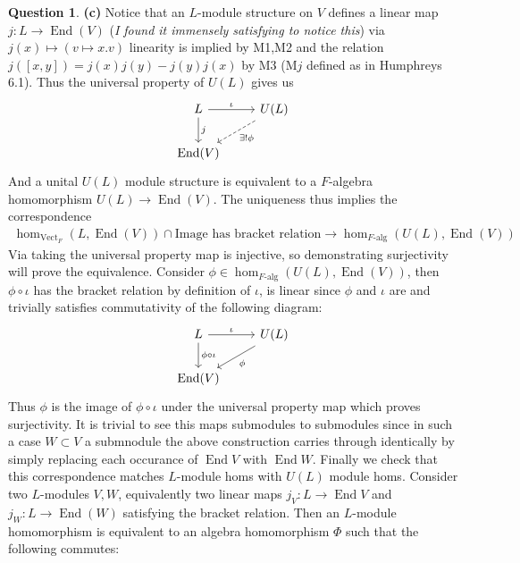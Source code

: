 \documentclass[10.5pt]{article}
\theoremstyle{definition}
\newtheorem{pb}{Question}
\numberwithin{example}{subsection}
\numberwithin{proposition}{subsection}
\begin{document}
\begin{pb}
        \textbf{(c)} Notice that an \(L\)-module structure on \(V\) defines a linear map \(j:L \to \operatorname{End}(V)\) (\emph{I found it immensely satisfying to notice this}) via \(j(x) \mapsto (v \mapsto x.v)\) linearity is implied by M1,M2 and the relation \(j([x,y]) = j(x)j(y) - j(y)j(x)\) by M3 (M\(j\) defined as in Humphreys 6.1). Thus the universal property of \(U(L)\) gives us
        \begin{equation}\begin{tikzcd}
            L \arrow[d,"j"] \arrow[r,"\iota"] &U(L) \arrow[dl,dashed,"\exists! \phi"] \\
            \operatorname{End}(V)
        \end{tikzcd}\end{equation}
        And a unital \(U(L)\) module structure is equivalent to a \(F\)-algebra homomorphism \(U(L) \to \operatorname{End}(V)\). The uniqueness thus implies the correspondence 
        \begin{align}
            \hom_{\operatorname{Vect}_F}(L,\operatorname{End}(V)) \cap \text{Image has bracket relation} \to \hom_{F\text{-alg}}(U(L),\operatorname{End}(V))
        \end{align} 
        Via taking the universal property map is injective, so demonstrating surjectivity will prove the equivalence. Consider \(\phi \in \hom_{F\text{-alg}}(U(L),\operatorname{End}(V))\), then \(\phi\circ \iota\) has the bracket relation by definition of \(\iota\), is linear since \(\phi\) and \(\iota\) are and trivially satisfies commutativity of the following diagram:
        \begin{equation}\begin{tikzcd}
            L \arrow[d,"\phi\circ\iota"] \arrow[r,"\iota"] &U(L) \arrow[dl,"\phi"] \\
            \operatorname{End}(V)
        \end{tikzcd}\end{equation}
        Thus \(\phi\) is the image of \(\phi\circ\iota\) under the universal property map which proves surjectivity. It is trivial to see this maps submodules to submodules since in such a case \(W \subset V\) a submnodule the above construction carries through identically by simply replacing each occurance of \(\operatorname{End}V\) with \(\operatorname{End}W\). Finally we check that this correspondence matches \(L\)-module homs with \(U(L)\) module homs. Consider two \(L\)-modules \(V,W\), equivalently two linear maps \(j_V: L \to \operatorname{End}V\) and \(j_W: L \to \operatorname{End}(W)\) satisfying the bracket relation. Then an \(L\)-module homomorphism is equivalent to an algebra homomorphism \(\Phi\) such that the following commutes:

\end{pb}
\end{document}
